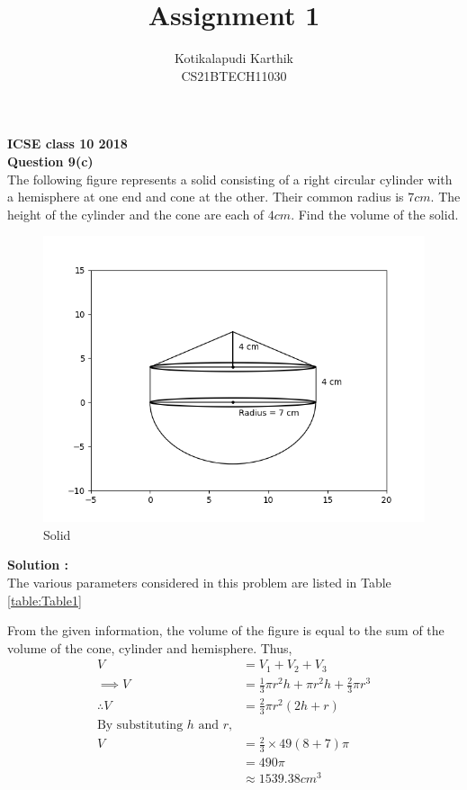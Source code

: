 \documentclass[journal,12pt,twocolumn]{IEEEtran}
\title{Assignment 1}
\author{Kotikalapudi Karthik \\
CS21BTECH11030}
\begin{document}
\maketitle

\textbf{ICSE class 10 2018}\\
\textbf{Question 9(c)}\\
The following figure represents a solid consisting of a right circular cylinder with a hemisphere at one end and cone at the other. Their common radius is $7cm$. The height of the cylinder and the cone are each of $4cm$. Find the volume of the solid.
\begin{figure}[ht!]
	  \centering 
	  \includegraphics[width=\columnwidth]{Figs/question9c.png}
	  \caption{Solid}
\end{figure}

\textbf{Solution :}\\
The various parameters considered in this problem are listed in Table
\eqref{table:Table1}
\begin{table}[ht!]
    \centering
    
    \caption{}
    \label{table:Table1}
\end{table}

From the given information, the volume of the figure is equal to the sum of the volume of the cone, cylinder and hemisphere. Thus,
\begin{align*}
    V &= V_1 + V_2 + V_3\\
    \implies V &= \frac{1}{3} \pi r^2 h + \pi r^2 h + \frac{2}{3} \pi r^3\\
    \therefore V&= \frac{2}{3} \pi r^2 (2h+r)\\
    \text{By substituting $h$ and $r$,}\\
    V &= \frac{2}{3} \times 49 (8+7) \pi\\
    &= 490 \pi\\ 
    &\approx 1539.38cm^3
\end{align*}
\end{document}

